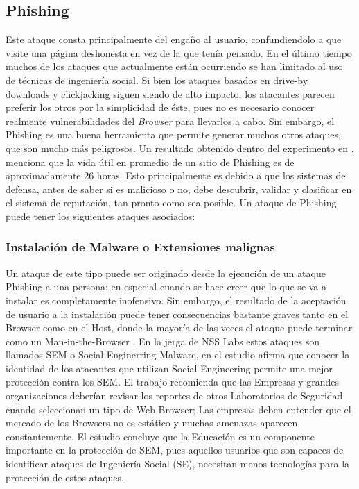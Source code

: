 \subsection{Phishing}
Este ataque consta principalmente del engaño al usuario, confundiendolo a que visite una página deshonesta en vez de la que tenía pensado. En el último tiempo muchos de los ataques que actualmente están ocurriendo se han limitado al uso de técnicas de ingeniería social. Si bien los ataques basados en drive-by downloads y clickjacking siguen siendo de alto impacto, los atacantes parecen preferir los otros por la simplicidad de éste, pues no es necesario conocer realmente vulnerabilidades del \textit{Browser} para llevarlos a cabo. Sin embargo, el Phishing es una buena herramienta que permite generar muchos otros ataques, que son mucho más peligrosos. Un resultado obtenido dentro del experimento en \cite{browSecPhish}, menciona que la vida útil en promedio de un sitio de Phishing es de aproximadamente 26 horas. Esto principalmente es debido a que los sistemas de defensa, antes de saber si es malicioso o no, debe descubrir, validar y clasificar en el sistema de reputación, tan pronto como sea posible. Un ataque de Phishing puede tener los siguientes ataques asociados:

	\subsubsection{Instalación de Malware o Extensiones malignas}
	Un ataque de este tipo puede ser originado desde la ejecución de un ataque Phishing a una persona; en especial cuando se hace creer que lo que se va a instalar es completamente inofensivo. Sin embargo, el resultado de la aceptación de usuario a la instalación puede tener consecuencias bastante graves tanto en el Browser como en el Host, donde la mayoría de las veces el ataque puede terminar como un Man-in-the-Browser \cite{Utakrit2009, Dougan2012}. En la jerga de NSS Labs estos ataques son llamados SEM o Social Enginerring Malware, en el estudio \cite{rowSecSEMBlock} afirma que conocer la identidad de los atacantes que utilizan Social Engineering permite una mejor protección contra los SEM. El trabajo recomienda que las Empresas y grandes organizaciones deberían revisar los reportes de otros Laboratorios de Seguridad cuando seleccionan un tipo de Web Browser; Las empresas deben entender que el mercado de los Browsers no es estático y muchas amenazas aparecen constantemente. El estudio concluye que la Educación es un componente importante en la protección de SEM, pues aquellos usuarios que son capaces de identificar ataques de Ingeniería Social (SE), necesitan menos tecnologías para la protección de estos ataques.


